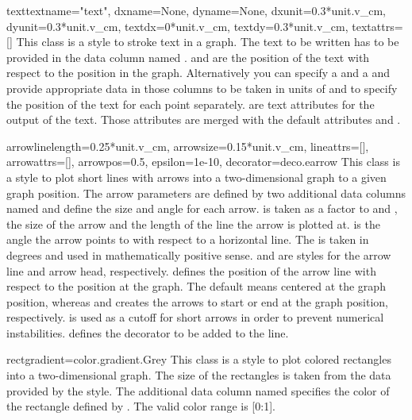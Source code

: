 \begin{classdesc}{text}{textname="text", dxname=None, dyname=None, %
                        dxunit=0.3*unit.v\_cm, dyunit=0.3*unit.v\_cm,
                        textdx=0*unit.v\_cm, textdy=0.3*unit.v\_cm,
                        textattrs=[]}
  This class is a style to stroke text in a graph. The
  text to be written has to be provided in the data column named
  .  and  are the position of the
  text with respect to the position in the graph. Alternatively you can
  specify a  and a  and provide appropriate
  data in those columns to be taken in units of  and
   to specify the position of the text for each point
  separately.  are text attributes for the output of
  the text. Those attributes are merged with the default attributes
   and .
\end{classdesc} %

\begin{classdesc}{arrow}{linelength=0.25*unit.v\_cm, %
                         arrowsize=0.15*unit.v\_cm,
                         lineattrs=[], arrowattrs=[], arrowpos=0.5,
                         epsilon=1e-10, decorator=deco.earrow}
  This class is a style to plot short lines with arrows into a
  two-dimensional graph to a given graph position. The arrow
  parameters are defined by two additional data columns named
   and  define the size and angle for each
  arrow.  is taken as a factor to  and
  , the size of the arrow and the length of the line
  the arrow is plotted at.  is the angle the arrow points
  to with respect to a horizontal line. The  is taken in
  degrees and used in mathematically positive sense. 
  and  are styles for the arrow line and arrow head,
  respectively.  defines the position of the arrow line
  with respect to the position at the graph. The default 
  means centered at the graph position, whereas  and 
  creates the arrows to start or end at the graph position,
  respectively.  is used as a cutoff for short arrows in
  order to prevent numerical instabilities.  defines
  the decorator to be added to the line.
\end{classdesc} %

\begin{classdesc}{rect}{gradient=color.gradient.Grey} %
  This class is a style to plot colored rectangles into a
  two-dimensional graph. The size of the rectangles is taken from
  the data provided by the  style. The additional
  data column named  specifies the color of the rectangle
  defined by . The valid color range is [0:1].
\end{classdesc} %

